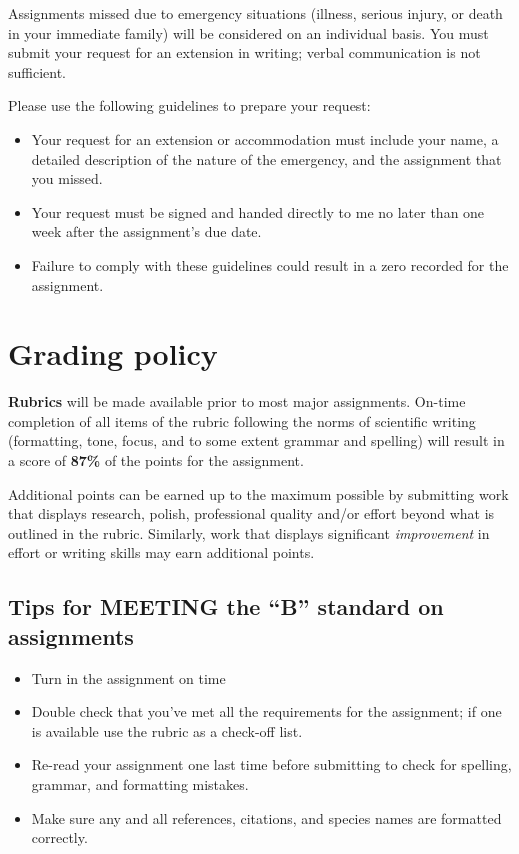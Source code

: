 \documentclass[
]{book}
\providecommand{\tightlist}{%
  \setlength{\itemsep}{0pt}\setlength{\parskip}{0pt}}
\begin{document}
Assignments missed due to emergency situations (illness, serious injury, or death in your immediate family) will be considered on an individual basis. You must submit your request for an extension in writing; verbal communication is not sufficient.

Please use the following guidelines to prepare your request:

\begin{itemize}
\tightlist
\item
  Your request for an extension or accommodation must include your name, a detailed description of the nature of the emergency, and the assignment that you missed.
\item
  Your request must be signed and handed directly to me no later than one week after the assignment's due date.
\item
  Failure to comply with these guidelines could result in a zero recorded for the assignment.
\end{itemize}

\hypertarget{grading-policy}{%
\chapter{Grading policy}\label{grading-policy}}

\textbf{Rubrics} will be made available prior to most major assignments. On-time completion of all items of the rubric following the norms of scientific writing (formatting, tone, focus, and to some extent grammar and spelling) will result in a score of \textbf{87\%} of the points for the assignment.

Additional points can be earned up to the maximum possible by submitting work that displays research, polish, professional quality and/or effort beyond what is outlined in the rubric. Similarly, work that displays significant \emph{improvement} in effort or writing skills may earn additional points.

\hypertarget{tips-for-meeting-the-b-standard-on-assignments}{%
\section{Tips for MEETING the ``B'' standard on assignments}\label{tips-for-meeting-the-b-standard-on-assignments}}

\begin{itemize}
\tightlist
\item
  Turn in the assignment on time
\item
  Double check that you've met all the requirements for the assignment; if one is available use the rubric as a check-off list.
\item
  Re-read your assignment one last time before submitting to check for spelling, grammar, and formatting mistakes.
\item
  Make sure any and all references, citations, and species names are formatted correctly.
\end{itemize}
\end{document}
